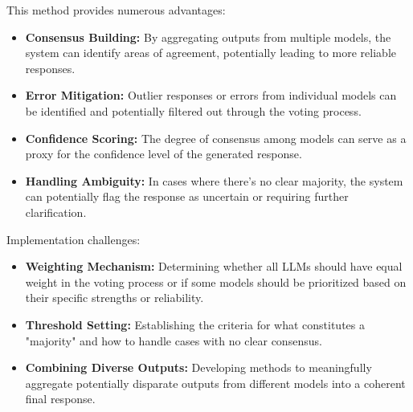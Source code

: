 This method provides numerous advantages:
\begin{itemize}
    \item \textbf{Consensus Building:} By aggregating outputs from multiple models, the system can identify areas of agreement, potentially leading to more reliable responses.
    \item \textbf{Error Mitigation:} Outlier responses or errors from individual models can be identified and potentially filtered out through the voting process.
    \item \textbf{Confidence Scoring:} The degree of consensus among models can serve as a proxy for the confidence level of the generated response.
    \item \textbf{Handling Ambiguity:} In cases where there's no clear majority, the system can potentially flag the response as uncertain or requiring further clarification.
\end{itemize}

Implementation challenges:
\begin{itemize}
    \item \textbf{Weighting Mechanism:} Determining whether all LLMs should have equal weight in the voting process or if some models should be prioritized based on their specific strengths or reliability.
    \item \textbf{Threshold Setting:} Establishing the criteria for what constitutes a "majority" and how to handle cases with no clear consensus.
    \item \textbf{Combining Diverse Outputs:} Developing methods to meaningfully aggregate potentially disparate outputs from different models into a coherent final response.
\end{itemize}


